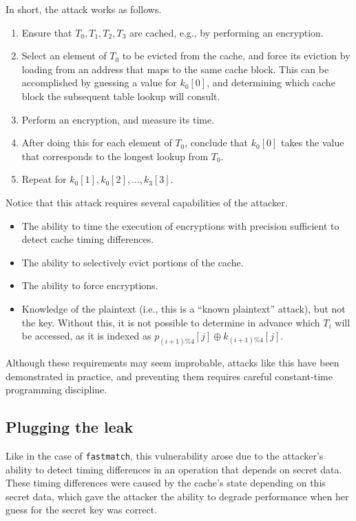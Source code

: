 \documentclass[11pt,twoside]{scrartcl}
\begin{document}
In short, the attack works as follows.
\begin{enumerate}
\item Ensure that $T_0,T_1,T_2,T_3$ are cached, e.g., by performing an encryption.
\item Select an element of $T_0$ to be evicted from the cache, and force its eviction by loading from an address that maps to the same cache block. This can be accomplished by guessing a value for $k_0[0]$, and determining which cache block the subsequent table lookup will consult.
\item Perform an encryption, and measure its time.
\item After doing this for each element of $T_0$, conclude that $k_0[0]$ takes the value that corresponds to the longest lookup from $T_0$.
\item Repeat for $k_0[1], k_0[2], \ldots, k_3[3]$.
\end{enumerate}
Notice that this attack requires several capabilities of the attacker.
\begin{itemize}
\item The ability to time the execution of encryptions with precision sufficient to detect cache timing differences.
\item The ability to selectively evict portions of the cache.
\item The ability to force encryptions.
\item Knowledge of the plaintext (i.e., this is a ``known plaintext'' attack), but not the key. Without this, it is not possible to determine in advance which $T_i$ will be accessed, as it is indexed as $p_{(i+1)\% 4}[j] \oplus k_{(i+1)\%4}[j]$.
\end{itemize}
Although these requirements may seem improbable, attacks like this have been demonstrated in practice, and preventing them requires careful constant-time programming discipline.

\subsection{Plugging the leak} 

Like in the case of \texttt{fastmatch}, this vulnerability arose due to the attacker's ability to detect timing differences in an operation that depends on secret data. These timing differences were caused by the cache's state depending on this secret data, which gave the attacker the ability to degrade performance when her guess for the secret key was correct.
\end{document}
